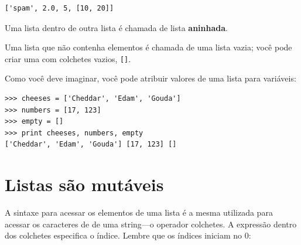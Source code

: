 \beforeverb
\begin{verbatim}
['spam', 2.0, 5, [10, 20]]
\end{verbatim}
\afterverb

Uma lista dentro de outra lista é chamada de lista {\bf aninhada}.


Uma lista que não contenha elementos
é chamada de uma lista vazia; você pode criar uma com 
colchetes vazios, \verb"[]".


Como você deve imaginar, você pode atribuir valores de uma lista para variáveis:

\beforeverb
\begin{verbatim}
>>> cheeses = ['Cheddar', 'Edam', 'Gouda']
>>> numbers = [17, 123]
>>> empty = []
>>> print cheeses, numbers, empty
['Cheddar', 'Edam', 'Gouda'] [17, 123] []
\end{verbatim}
\afterverb
%


\section{Listas são mutáveis}


A sintaxe para acessar os elementos de uma lista é a mesma utilizada
para acessar os caracteres de de uma string---o operador colchetes.
A expressão dentro dos colchetes especifica o índice. Lembre que os 
índices iniciam no 0:

